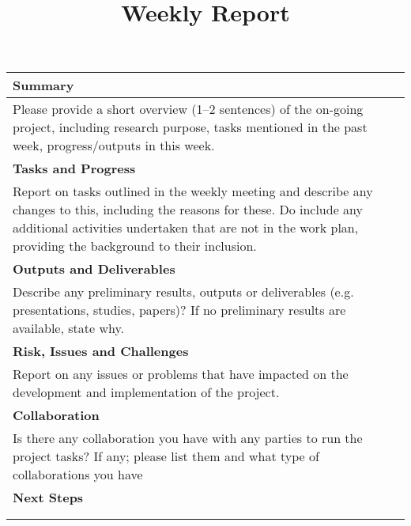 \documentclass[a4paper]{article}
\title{Weekly Report}
\makeatletter
\newcommand{\Authorname}[0]{\@author\xspace}
\newcommand{\Item}[1]{\textbf{\large #1}}
\makeatother
\begin{document}
\mbox{}

\begin{longtable}{|p{2.2in}|p{4.64in}|}
  \firsthline
  \Item{Name:}             & \Authorname                               \\
  \hline
  \Item{Project Name:}     &                                           \\
  \hline
  \Item{Reporting Period:} & Week                                      \\
  \hline
  \multicolumn{2}{|p{\linewidth}|}{\Item{Summary}}                     \\
  \hline
  \multicolumn{2}{|p{\linewidth}|}{%
  Please provide a short overview (1--2 sentences) of the on-going project,
  including research purpose, tasks mentioned in the past week,
  progress/outputs in this week.
  }                                                                    \\
  \hline
  \multicolumn{2}{|p{\linewidth}|}{\Item{Tasks and Progress}}          \\
  \hline
  \multicolumn{2}{|p{\linewidth}|}{%
  Report on tasks outlined in the weekly meeting and describe any changes
  to this, including the reasons for these. Do include any additional
  activities undertaken that are not in the work plan, providing the
  background to their inclusion.
  }                                                                    \\
  \hline
  \multicolumn{2}{|p{\linewidth}|}{\Item{Outputs and Deliverables}}    \\
  \hline
  \multicolumn{2}{|p{\linewidth}|}{%
  Describe any preliminary results, outputs or deliverables (e.g.
  presentations, studies, papers)? If no preliminary results are available,
  state why.
  }                                                                    \\
  \hline
  \multicolumn{2}{|p{\linewidth}|}{\Item{Risk, Issues and Challenges}} \\
  \hline
  \multicolumn{2}{|p{\linewidth}|}{%
  Report on any issues or problems that have impacted on the development
  and implementation of the project.
  }                                                                    \\
  \hline
  \multicolumn{2}{|p{\linewidth}|}{\Item{Collaboration}}               \\
  \hline
  \multicolumn{2}{|p{\linewidth}|}{%
  Is there any collaboration you have with any parties to run the project
  tasks? If any; please list them and what type of collaborations you have
  }                                                                    \\
  \hline
  \multicolumn{2}{|p{\linewidth}|}{\Item{Next Steps}}                  \\
  \hline
  \multicolumn{2}{|p{\linewidth}|}{%
  }                                                                    \\
  \lasthline
\end{longtable}
\end{document}
